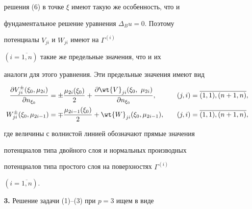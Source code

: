 решения (6) в точке $\xi$ имеют такую же особенность, что и


фундаментальное решение уравнения $\Delta_Bu=0$. Поэтому


потенциалы $V_{ji}$ и $W_{ji}$ имеют на $\Gamma^{(i)}$


$(i=\overline{1,n})$ такие же предельные значения, что и их


аналоги для этого уравнения. Эти предельные значения имеют вид


\begin{alignat}{2}


\frac{\partial V_{ji}^{\pm}(\xi_0,\mu_{2i})}{\partial


n_{\xi_0}}&= \pm\frac{\mu_{2i}(\xi_0)}{2}+ \frac{\partial


\wt{V}_{ji}(\xi_0,\ \mu_{2i})}{\partial n_{\xi_0}},&\quad


(j,i)&=\overline{(1,1),(n+1,n)},\\


%


W_{ji}^{\pm}(\xi_0,


\mu_{2i-1})&=\mp\frac{\mu_{2i-1}(\xi_0)}{2}+\wt{W}_{ji}(\xi_0,


\mu_{2i-1}),&\quad (j,i)&=\overline{(1,1),(n+1,n)},


\end{alignat}


где величины с волнистой линией обозначают прямые значения


потенциалов типа двойного слоя и нормальных производных


потенциалов типа простого слоя на поверхностях $\Gamma^{(i)}$


$(i=\overline{1,n})$.


\medskip





{\bf 3.} Решение задачи (1)--(3) при $p=3$ ищем в виде


